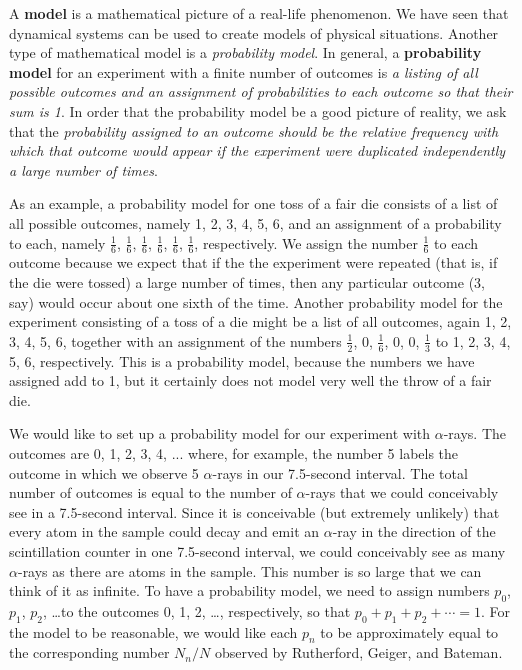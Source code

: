 A {\bf model} is a mathematical picture of a real-life
phenomenon.  We have seen that dynamical systems can be used to create
models of physical situations.  Another type of mathematical model is
a {\em probability model}.  In general, a {\bf probability
  model} for an experiment with a finite
number of outcomes is {\em a listing of all possible outcomes and an
  assignment of probabilities to each outcome so that their sum is 1}.
In order that the probability model be a good picture of reality, we
ask that the {\em probability assigned to an outcome should be the
  relative frequency with which that outcome would appear if the
  experiment were duplicated independently a large number of times}.

As an example, a probability model for one toss of a fair die consists
of a list of all possible outcomes, namely 1, 2, 3, 4, 5, 6, and an
assignment of a probability to each, namely $\frac{1}{6}$,
$\frac{1}{6}$, $\frac{1}{6}$, $\frac{1}{6}$, $\frac{1}{6}$,
$\frac{1}{6}$, respectively.  We assign the number $\frac{1}{6}$ to
each outcome because we expect that if the the experiment were
repeated (that is, if the die were tossed) a large number of times,
then any particular outcome (3, say) would occur about one sixth of
the time.  Another probability model for the experiment consisting of
a toss of a die might be a list of all outcomes, again 1, 2, 3, 4, 5,
6, together with an assignment of the numbers $\frac{1}{2}$, 0,
$\frac{1}{6}$, 0, 0, $\frac{1}{3}$ to 1, 2, 3, 4, 5, 6, respectively.
This is a probability model, because the numbers we have assigned add
to 1, but it certainly does not model very well the throw of a fair
die.

We would like to set up a probability model for our experiment with
$\alpha$-rays.  The outcomes are 0, 1, 2, 3, 4, ... where, for
example, the number 5 labels the outcome in which we observe 5
$\alpha$-rays in our 7.5-second interval.  The total number of
outcomes is equal to the number of $\alpha$-rays that we could
conceivably see in a 7.5-second interval.  Since it is conceivable
(but extremely unlikely) that every atom in the sample could decay and
emit an $\alpha$-ray in the direction of the scintillation counter in
one 7.5-second interval, we could conceivably see as many
$\alpha$-rays as there are atoms in the sample. This number is so
large that we can think of it as infinite.  To have a probability
model, we need to assign numbers $p_0$, $p_1$, $p_2$, \ldots to the
outcomes 0, 1, 2, \ldots, respectively, so that $p_0 + p_1 + p_2 +
\cdots = 1$.  For the model to be reasonable, we would like each $p_n$
to be approximately equal to the corresponding number $N_n/N$ observed
by Rutherford, Geiger, and Bateman.



